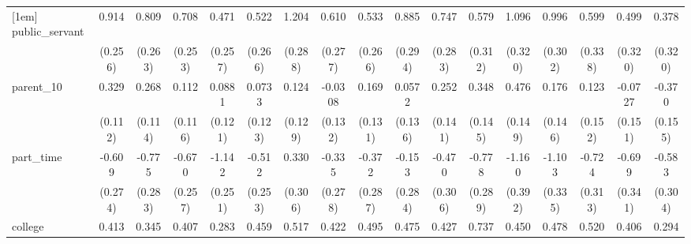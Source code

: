 {\begin{tabular}{l*{16}{c}}
[1em]
public\_servant      &       0.914\sym{***}&       0.809\sym{**} &       0.708\sym{**} &       0.471         &       0.522\sym{*}  &       1.204\sym{***}&       0.610\sym{*}  &       0.533\sym{*}  &       0.885\sym{**} &       0.747\sym{**} &       0.579         &       1.096\sym{***}&       0.996\sym{***}&       0.599         &       0.499         &       0.378         \\
                    &     (0.256)         &     (0.263)         &     (0.253)         &     (0.257)         &     (0.266)         &     (0.288)         &     (0.277)         &     (0.266)         &     (0.294)         &     (0.283)         &     (0.312)         &     (0.320)         &     (0.302)         &     (0.338)         &     (0.320)         &     (0.320)         \\
[1em]
parent\_10           &       0.329\sym{**} &       0.268\sym{*}  &       0.112         &      0.0881         &      0.0733         &       0.124         &     -0.0308         &       0.169         &      0.0572         &       0.252         &       0.348\sym{*}  &       0.476\sym{**} &       0.176         &       0.123         &     -0.0727         &      -0.370\sym{*}  \\
                    &     (0.112)         &     (0.114)         &     (0.116)         &     (0.121)         &     (0.123)         &     (0.129)         &     (0.132)         &     (0.131)         &     (0.136)         &     (0.141)         &     (0.145)         &     (0.149)         &     (0.146)         &     (0.152)         &     (0.151)         &     (0.155)         \\
[1em]
part\_time           &      -0.609\sym{*}  &      -0.775\sym{**} &      -0.670\sym{**} &      -1.142\sym{***}&      -0.512\sym{*}  &       0.330         &      -0.335         &      -0.372         &      -0.153         &      -0.470         &      -0.778\sym{**} &      -1.160\sym{**} &      -1.103\sym{***}&      -0.724\sym{*}  &      -0.699\sym{*}  &      -0.583         \\
                    &     (0.274)         &     (0.283)         &     (0.257)         &     (0.251)         &     (0.253)         &     (0.306)         &     (0.278)         &     (0.287)         &     (0.284)         &     (0.306)         &     (0.289)         &     (0.392)         &     (0.335)         &     (0.313)         &     (0.341)         &     (0.304)         \\
[1em]
college             &       0.413\sym{**} &       0.345\sym{**} &       0.407\sym{**} &       0.283\sym{*}  &       0.459\sym{**} &       0.517\sym{***}&       0.422\sym{**} &       0.495\sym{**} &       0.475\sym{**} &       0.427\sym{**} &       0.737\sym{***}&       0.450\sym{*}  &       0.478\sym{**} &       0.520\sym{**} &       0.406\sym{*}  &       0.294         \\

\end{tabular}}

